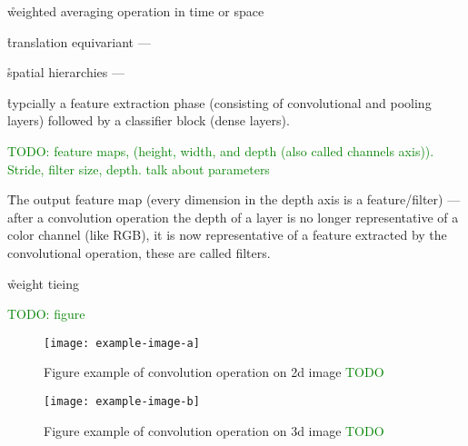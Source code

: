 



\r{weighted averaging operation in time or space}


\r{translation equivariant --- }



\r{spatial hierarchies --- }


\r{typcially a feature extraction phase (consisting of convolutional and pooling layers) followed by a classifier block (dense layers).}

\textcolor{green}{TODO: feature maps, (height, width, and depth (also called channels axis)). Stride, filter size, depth. talk about parameters}

\r{The output feature map (every dimension in the depth axis is a feature/filter) --- after a convolution operation the depth of a layer is no longer representative of a color channel (like RGB), it is now representative of a feature extracted by the convolutional operation, these are called filters.}



\r{weight tieing}


\textcolor{green}{TODO: figure}

\begin{figure}[htp]
	\centering
	\texttt{[image: example-image-a]}\hfil
	\caption{Figure example of convolution operation on 2d image \textcolor{green}{TODO}}
	\label{fig:conv_2d_example_calc}
\end{figure}

\begin{figure}[htp]
	\centering
	\texttt{[image: example-image-b]}\hfil
	\caption{Figure example of convolution operation on 3d image \textcolor{green}{TODO}}
	\label{fig:conv_2d_depth_example_calc}
\end{figure}

